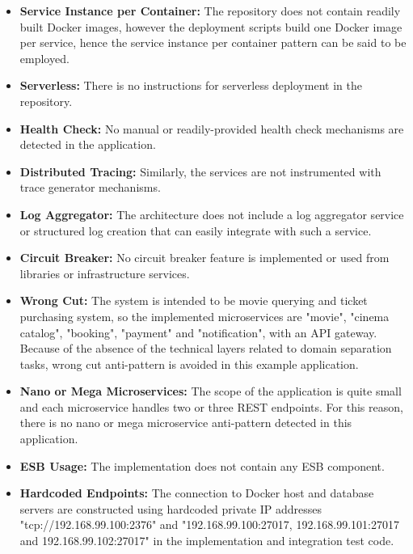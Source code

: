 \documentclass{Configuration_Files/PoliMi3i_thesis}
\begin{document}
\begin{itemize}
    \item \textbf{Service Instance per Container:} The repository does not contain readily built Docker images, however the deployment scripts build one Docker image per service, hence the service instance per container pattern can be said to be employed.
    
    \item \textbf{Serverless:} There is no instructions for serverless deployment in the repository.
    
    \item \textbf{Health Check:} No manual or readily-provided health check mechanisms are detected in the application.
    
    \item \textbf{Distributed Tracing:} Similarly, the services are not instrumented with trace generator mechanisms.
    
    \item \textbf{Log Aggregator:} The architecture does not include a log aggregator service or structured log creation that can easily integrate with such a service.
    
    \item \textbf{Circuit Breaker:} No circuit breaker feature is implemented or used from libraries or infrastructure services.
    
    \item \textbf{Wrong Cut:} The system is intended to be movie querying and ticket purchasing system, so the implemented microservices are "movie", "cinema catalog", "booking", "payment" and "notification", with an API gateway.
    Because of the absence of the technical layers related to domain separation tasks, wrong cut anti-pattern is avoided in this example application.
    
    \item \textbf{Nano or Mega Microservices:} The scope of the application is quite small and each microservice handles two or three REST endpoints.
    For this reason, there is no nano or mega microservice anti-pattern detected in this application.
    
    \item \textbf{ESB Usage:} The implementation does not contain any ESB component.
    
    \item \textbf{Hardcoded Endpoints:} The connection to Docker host and database servers are constructed using hardcoded private IP addresses "tcp://192.168.99.100:2376" and "192.168.99.100:27017, 192.168.99.101:27017 and 192.168.99.102:27017" in the implementation and integration test code.
    

\end{itemize}
\end{document}
